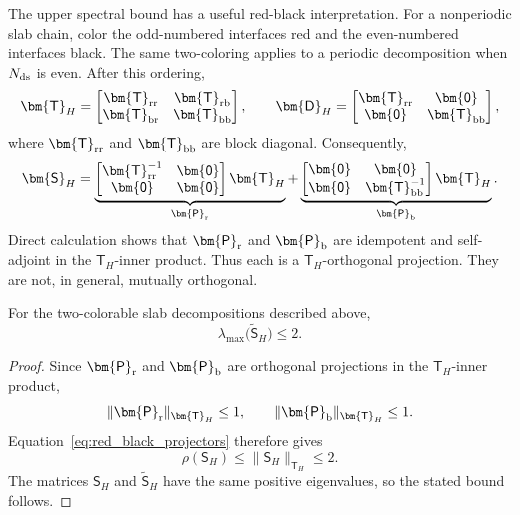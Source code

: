 \documentclass[final,onefignum,onetabnum]{siamart250211}
\newcommand{\mtx}[1]{\bm{\mathsf{#1}}}
\theoremstyle{definition}
\begin{document}
The upper spectral bound has a useful red-black interpretation.  For a nonperiodic slab chain, color the odd-numbered interfaces red and the even-numbered interfaces black.  The same two-coloring applies to a periodic decomposition when $N_{\rm ds}$ is even.  After this ordering,
\[
  \mtx{T}_H
  =\begin{bmatrix}
      \mtx{T}_{\rm rr}&\mtx{T}_{\rm rb}\\
      \mtx{T}_{\rm br}&\mtx{T}_{\rm bb}
    \end{bmatrix},
  \qquad
  \mtx{D}_H
  =\begin{bmatrix}
      \mtx{T}_{\rm rr}&\mtx{0}\\
      \mtx{0}&\mtx{T}_{\rm bb}
    \end{bmatrix},
\]
where $\mtx{T}_{\rm rr}$ and $\mtx{T}_{\rm bb}$ are block diagonal.  Consequently,
\begin{equation}
  \mtx{S}_H
  =\underbrace{
    \begin{bmatrix}
      \mtx{T}_{\rm rr}^{-1}&\mtx{0}\\
      \mtx{0}&\mtx{0}
    \end{bmatrix}\mtx{T}_H}_{\mtx{P}_{\rm r}}
  +\underbrace{
    \begin{bmatrix}
      \mtx{0}&\mtx{0}\\
      \mtx{0}&\mtx{T}_{\rm bb}^{-1}
    \end{bmatrix}\mtx{T}_H}_{\mtx{P}_{\rm b}}.
  \label{eq:red_black_projectors}
\end{equation}
Direct calculation shows that $\mtx{P}_{\rm r}$ and $\mtx{P}_{\rm b}$ are idempotent and self-adjoint in the $\mtx{T}_H$-inner product.  Thus each is a $\mtx{T}_H$-orthogonal projection.  They are not, in general, mutually orthogonal.

\begin{proposition}
\label{prop:red_black_upper_bound}
For the two-colorable slab decompositions described above,
\[
  \lambda_{\max}\bigl(\widetilde{\mtx{S}}_H\bigr)\le 2.
\]
\end{proposition}

\begin{proof}
Since $\mtx{P}_{\rm r}$ and $\mtx{P}_{\rm b}$ are orthogonal projections in the $\mtx{T}_H$-inner product,
\[
  \|\mtx{P}_{\rm r}\|_{\mtx{T}_H}\le1,
  \qquad
  \|\mtx{P}_{\rm b}\|_{\mtx{T}_H}\le1.
\]
Equation~\eqref{eq:red_black_projectors} therefore gives
\[
  \rho(\mtx{S}_H)
  \le\|\mtx{S}_H\|_{\mtx{T}_H}
  \le2.
\]
The matrices $\mtx{S}_H$ and $\widetilde{\mtx{S}}_H$ have the same positive eigenvalues, so the stated bound follows.
\end{proof}
\end{document}
